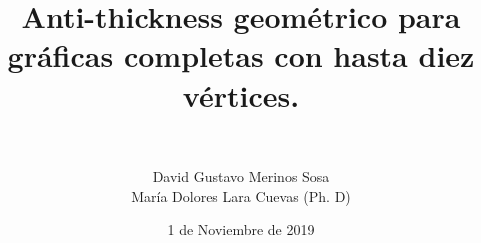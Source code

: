 \documentclass[xcolor={x11names,svgnames,dvipsnames,table}]{beamer}
\author{David Gustavo Merinos Sosa \\ María Dolores Lara Cuevas (Ph. D)}
\title{Anti-thickness geométrico para gráficas completas con hasta diez vértices.}
\subtitle{\texorpdfstring{
\hrulefill\ \adforn{57}\thickspace\pgfornament[height=0.75em,ydelta=-0.25em]{1}\thickspace\adforn{29}\ \hrulefill}{ }}
\date{1 de Noviembre de 2019}
\begin{document}
\begin{frame}[plain]
\maketitle
\end{frame}





%
%
%
\end{document}
